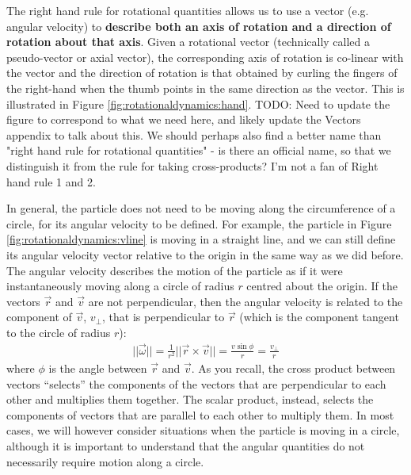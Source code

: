 The right hand rule for rotational quantities allows us to use a vector (e.g. angular velocity) to \textbf{describe both an axis of rotation and a direction of rotation about that axis}. Given a rotational vector (technically called a pseudo-vector or axial vector), the corresponding axis of rotation is co-linear with the vector and the direction of rotation is that obtained by curling the fingers of the right-hand when the thumb points in the same direction as the vector. This is illustrated in Figure \ref{fig:rotationaldynamics:hand}.
TODO: Need to update the figure to correspond to what we need here, and likely update the Vectors appendix to talk about this. We should perhaps also find a better name than "right hand rule for rotational quantities" - is there an official name, so that we distinguish it from the rule for taking cross-products? I'm not a fan of Right hand rule 1 and 2.

In general, the particle does not need to be moving along the circumference of a circle, for its angular velocity to be defined. For example, the particle in Figure \ref{fig:rotationaldynamics:vline} is moving in a straight line, and we can still define its angular velocity vector relative to the origin in the same way as we did before. 
The angular velocity describes the motion of the particle as if it were instantaneously moving along a circle of radius $r$ centred about the origin. If the vectors $\vec r$ and $\vec v$ are not perpendicular, then the angular velocity is related to the component of $\vec v$, $v_\perp$, that is perpendicular to $\vec r$ (which is the component tangent to the circle of radius $r$):
\begin{align}
||\vec \omega|| = \frac{1}{r^2} || \vec r \times \vec v||=\frac{v\sin\phi}{r}= \frac{v_\perp}{r}
\end{align}
where $\phi$ is the angle between $\vec r$ and $\vec v$. As you recall, the cross product between vectors ``selects'' the components of the vectors that are perpendicular to each other and multiplies them together. The scalar product, instead, selects the components of vectors that are parallel to each other to multiply them. In most cases, we will however consider situations when the particle is moving in a circle, although it is important to understand that the angular quantities do not necessarily require motion along a circle.


